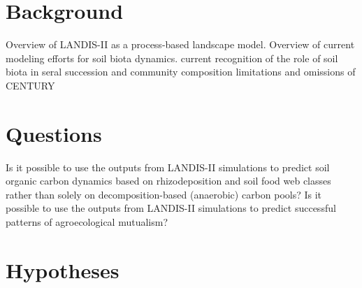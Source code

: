 \section{Background}

\begin{outline}[enumerate]
\1 Overview of LANDIS-II as a process-based landscape model.
\1 Overview of current modeling efforts for soil biota dynamics.
\2 current recognition of the role of soil biota in seral succession and community composition 
\2 limitations and omissions of CENTURY
\1
\end{outline}


\section{Questions}

\begin{outline}[enumerate]
\1 Is it possible to use the outputs from LANDIS-II simulations to predict soil organic carbon dynamics based on rhizodeposition and soil food web classes rather than solely on decomposition-based (anaerobic) carbon pools?
\1 Is it possible to use the outputs from LANDIS-II simulations to predict successful patterns of agroecological mutualism?
\1
\end{outline}


\section{Hypotheses}



